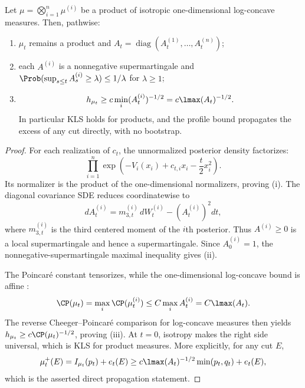 \documentclass[../main.tex]{subfiles}
\begin{document}
\begin{proposition}[= Proposition~\ref{prop:products}]
\label{prop:sol-products}
Let $\mu=\bigotimes_{i=1}^n\mu^{(i)}$ be a product of isotropic one-dimensional log-concave
measures.  Then, pathwise:
\begin{enumerate}[label=(\roman*),leftmargin=2.2em]
  \item $\mu_t$ remains a product and
        $A_t=\operatorname{diag}(A_t^{(1)},\ldots,A_t^{(n)})$;
  \item each $A^{(i)}$ is a nonnegative supermartingale and
        $\Prob(\sup_{s\le t}A_s^{(i)}\ge\lambda)\le1/\lambda$ for $\lambda\ge1$;
  \item
        \[
          h_{\mu_t}\ge c\min_i(A_t^{(i)})^{-1/2}
          =c\lmax(A_t)^{-1/2}.
        \]
        In particular KLS holds for products, and the profile bound propagates the excess of any
        cut directly, with no bootstrap.
\end{enumerate}
\end{proposition}

\begin{proof}
For each realization of $c_t$, the unnormalized posterior density factorizes:
\[
  \prod_{i=1}^n
  \exp\left(-V_i(x_i)+c_{t,i}x_i-\frac t2x_i^2\right).
\]
Its normalizer is the product of the one-dimensional normalizers, proving (i).  The diagonal
covariance SDE reduces coordinatewise to
\[
  dA_t^{(i)}=m_{3,t}^{(i)}\,dW_t^{(i)}-(A_t^{(i)})^2dt,
\]
where $m_{3,t}^{(i)}$ is the third centered moment of the $i$th posterior.  Thus
$A^{(i)}\ge0$ is a local supermartingale and hence a supermartingale.  Since
$A_0^{(i)}=1$, the nonnegative-supermartingale maximal inequality gives (ii).

The Poincar\'e constant tensorizes, while the one-dimensional log-concave bound is affine
\cite{BakryGentilLedoux2014,LeeVempala2018}:
\[
  \CP(\mu_t)=\max_i\CP(\mu_t^{(i)})
  \le C\max_i A_t^{(i)}=C\lmax(A_t).
\]
The reverse Cheeger--Poincar\'e comparison for log-concave measures
\cite{BakryGentilLedoux2014,LeeVempala2018} then yields
$h_{\mu_t}\ge c\CP(\mu_t)^{-1/2}$, proving (iii).  At $t=0$, isotropy makes the right side
universal, which is KLS for product measures.  More explicitly, for any cut $E$,
\[
  \mu_t^+(E)=I_{\mu_t}(p_t)+e_t(E)
  \ge c\lmax(A_t)^{-1/2}\min(p_t,q_t)+e_t(E),
\]
which is the asserted direct propagation statement.
\end{proof}
\end{document}
